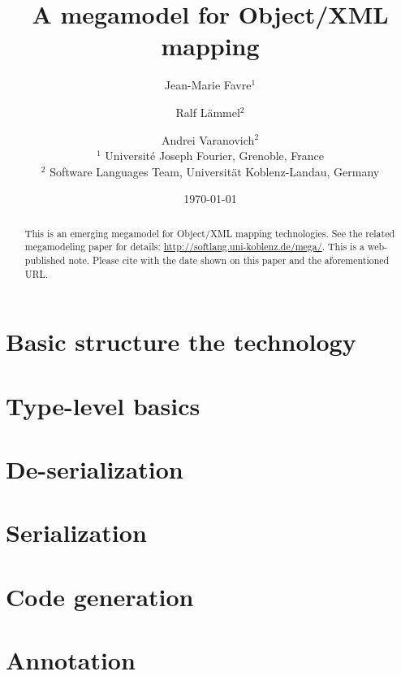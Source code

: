 \documentclass{article}
\title{A megamodel for Object/XML mapping}
\author{Jean-Marie Favre$^1$ \and Ralf L{\"a}mmel$^2$ \and Andrei Varanovich$^2$\\
$^1$ Universit\'e Joseph Fourier, Grenoble, France\\
$^2$ Software Languages Team, Universit{\"a}t Koblenz-Landau, Germany}
\date{\today}
\begin{document}
\maketitle



\begin{abstract}
This is an emerging megamodel for Object/XML mapping technologies.
See the related megamodeling paper for details: 
\url{http://softlang.uni-koblenz.de/mega/}. This is a web-published note. 
Please cite with the date shown on this paper and the aforementioned URL. 
\end{abstract}

\tableofcontents

\newpage

\section{Basic structure the technology}



\newpage

\section{Type-level basics}



\newpage

\section{De-serialization}



\newpage

\section{Serialization}



\newpage

\section{Code generation}



\newpage

\section{Annotation}
\end{document}
